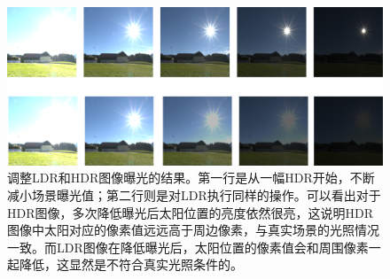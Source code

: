 \begin{figure}[htbp]
    \centering
    \includegraphics[width=1.0\textwidth]{Img/exposure-change.png}
    \caption[LDR图片与HDR图片在调整曝光时的不同]
    {调整LDR和HDR图像曝光的结果。第一行是从一幅HDR开始，不断减小场景曝光值；第二行则是对LDR执行同样的操作。可以看出对于HDR图像，多次降低曝光后太阳位置的亮度依然很亮，这说明HDR图像中太阳对应的像素值远远高于周边像素，与真实场景的光照情况一致。而LDR图像在降低曝光后，太阳位置的像素值会和周围像素一起降低，这显然是不符合真实光照条件的。}
    \label{fig:exposure-change}
\end{figure}
